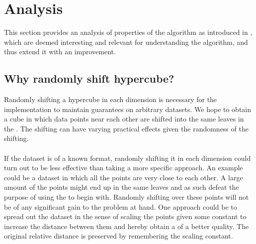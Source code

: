 \section{Analysis}
\label{analysis}
This section provides an analysis of properties of the \qs{} algorithm as introduced in \cite{wagner17}, which are deemed interesting and relevant for understanding the algorithm, and thus extend it with an improvement.


\subsection{Why randomly shift hypercube?}
Randomly shifting a hypercube in each dimension is necessary for the \qs{} implementation to maintain guarantees on arbitrary datasets. We hope to obtain a cube in which data points near each other are shifted into the same leaves in the \qt{}. The shifting can have varying practical effects given the randomness of the shifting.
\\
\\
If the dataset is of a known format, randomly shifting it in each dimension could turn out to be less effective than taking a more specific approach. An example could be a dataset in which all the points are very close to each other. A large amount of the points might end up in the same leaves and as such defeat the purpose of using the \qt{} to begin with. Randomly shifting over these points will not be of any significant gain to the problem at hand. One approach could be to spread out the dataset in the sense of scaling the points given some constant to increase the distance between them and hereby obtain a \qt{} of a better quality. The original relative distance is preserved by remembering the scaling constant.

